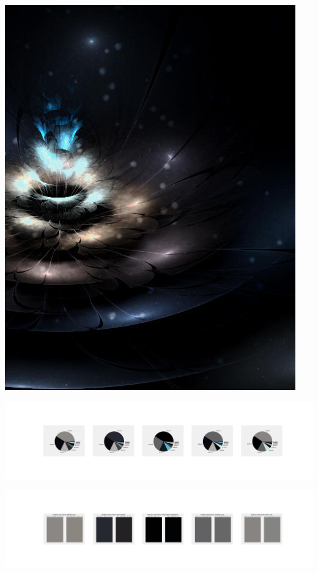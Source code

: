 \documentclass[11pt]{article}
\begin{document}
\begin{landscape}
    \begin{center}
    \includegraphics[width=\textwidth]{./nbimg/file (46).jpg}
    \end{center}

    \begin{center}
    \includegraphics[width=250mm]{./nbimg/pie-392.jpg}
    \end{center}

    \begin{center}
    \includegraphics[width=250mm]{./nbimg/peak-392.jpg}
    \end{center}
    


\end{landscape}
\end{document}
